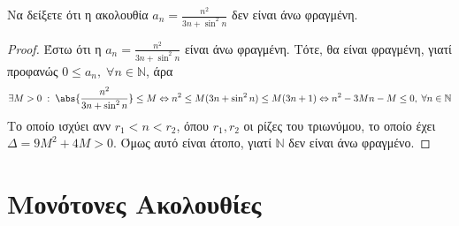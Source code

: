 \documentclass[a4paper,table]{report}
\begin{document}
\begin{enumerate}
  \item Να δείξετε ότι η ακολουθία $ a_{n} = \frac{n^{2}}{3n+ 
    \sin^{2}{n}} $ δεν είναι άνω φραγμένη.
    \begin{proof}
    \item {}
      Έστω ότι η $ a_{n}= \frac{n^{2}}{3n+ \sin^{2}{n}} $ είναι άνω φραγμένη.
      Τότε, θα είναι φραγμένη, γιατί προφανώς $ 0 \leq a_{n}, \; \forall n \in
      \mathbb{N} $, άρα
      \[
        \exists M>0 \; : \; \abs{\frac{n^{2}}{3n+ \sin^{2}{n}}} 
        \leq M \Leftrightarrow n^{2} \leq M(3n+ \sin^{2}{n}) \leq 
        M(3n+1) \Leftrightarrow n^{2}-3Mn-M \leq 0, \; \forall n \in \mathbb{N}
      \]
      Το οποίο ισχύει ανν $ r_{1}<n< r_{2} $,
      όπου $ r_{1}, r_{2} $ οι ρίζες του τριωνύμου, το οποίο έχει $ 
      \Delta= 9M^{2}+4M >0 $. Όμως αυτό είναι άτοπο, γιατί $ \mathbb{N} $ 
      δεν είναι άνω φραγμένο.
    \end{proof}
\end{enumerate}


\section{Μονότονες Ακολουθίες}
\end{document}
